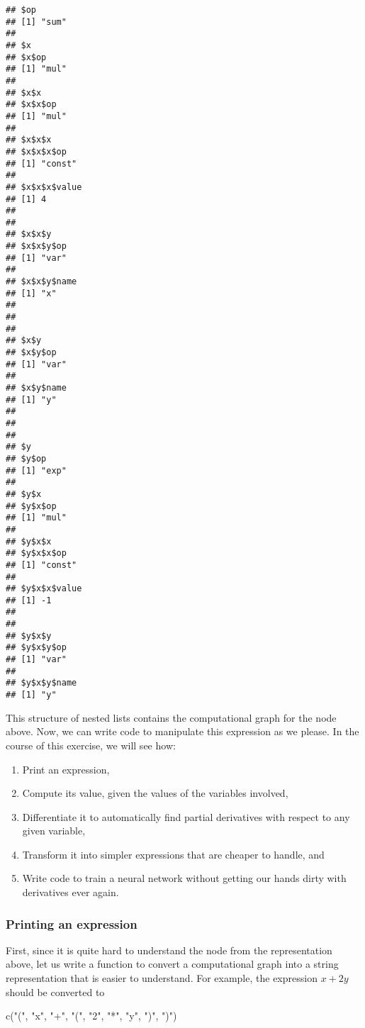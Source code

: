 \documentclass[
  a4paper,
]{article}
\newenvironment{Shaded}{\begin{snugshade}}{\end{snugshade}}
\newcommand{\FunctionTok}[1]{\textcolor[rgb]{0.00,0.00,0.00}{#1}}
\newcommand{\NormalTok}[1]{#1}
\newcommand{\StringTok}[1]{\textcolor[rgb]{0.31,0.60,0.02}{#1}}
\providecommand{\tightlist}{%
  \setlength{\itemsep}{0pt}\setlength{\parskip}{0pt}}
\begin{document}
\begin{verbatim}
## $op
## [1] "sum"
## 
## $x
## $x$op
## [1] "mul"
## 
## $x$x
## $x$x$op
## [1] "mul"
## 
## $x$x$x
## $x$x$x$op
## [1] "const"
## 
## $x$x$x$value
## [1] 4
## 
## 
## $x$x$y
## $x$x$y$op
## [1] "var"
## 
## $x$x$y$name
## [1] "x"
## 
## 
## 
## $x$y
## $x$y$op
## [1] "var"
## 
## $x$y$name
## [1] "y"
## 
## 
## 
## $y
## $y$op
## [1] "exp"
## 
## $y$x
## $y$x$op
## [1] "mul"
## 
## $y$x$x
## $y$x$x$op
## [1] "const"
## 
## $y$x$x$value
## [1] -1
## 
## 
## $y$x$y
## $y$x$y$op
## [1] "var"
## 
## $y$x$y$name
## [1] "y"
\end{verbatim}

This structure of nested lists contains the computational graph for the
node above. Now, we can write code to manipulate this expression as we
please. In the course of this exercise, we will see how:

\begin{enumerate}
\def\labelenumi{\arabic{enumi}.}
\tightlist
\item
  Print an expression,
\item
  Compute its value, given the values of the variables involved,
\item
  Differentiate it to automatically find partial derivatives with
  respect to any given variable,
\item
  Transform it into simpler expressions that are cheaper to handle, and
\item
  Write code to train a neural network without getting our hands dirty
  with derivatives ever again.
\end{enumerate}

\hypertarget{printing-an-expression}{%
\subsubsection{Printing an expression}\label{printing-an-expression}}

First, since it is quite hard to understand the node from the
representation above, let us write a function to convert a computational
graph into a string representation that is easier to understand. For
example, the expression \(x+2y\) should be converted to

\begin{Shaded}
\begin{Highlighting}[]
\FunctionTok{c}\NormalTok{(}\StringTok{"("}\NormalTok{, }\StringTok{"x"}\NormalTok{, }\StringTok{"+"}\NormalTok{, }\StringTok{"("}\NormalTok{, }\StringTok{"2"}\NormalTok{, }\StringTok{"*"}\NormalTok{, }\StringTok{"y"}\NormalTok{, }\StringTok{")"}\NormalTok{, }\StringTok{")"}\NormalTok{)}
\end{Highlighting}
\end{Shaded}
\end{document}

